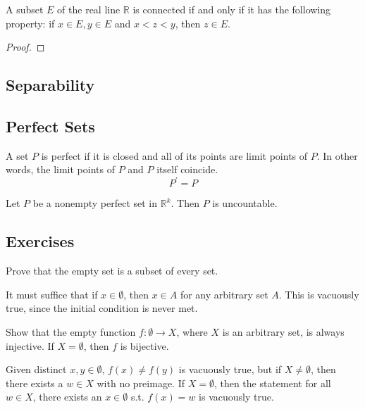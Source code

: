 \documentclass{article}
\begin{document}
    \begin{theorem}
    A subset $E$ of the real line $\mathbb{R}$ is connected if and only if it has the following property: if $x \in E, y \in E$ and $x < z < y$, then $z \in E$. 
    \end{theorem}
    \begin{proof}

    \end{proof}

  \subsection{Separability}

  \subsection{Perfect Sets}

    \begin{definition}
      A set $P$ is perfect if it is closed and all of its points are limit points of $P$. In other words, the limit points of $P$ and $P$ itself coincide. 
      \begin{equation}
        P^\prime = P
      \end{equation}
    \end{definition}

    \begin{theorem}
      Let $P$ be a nonempty perfect set in $\mathbb{R}^k$. Then $P$ is uncountable. 
    \end{theorem}

  \subsection{Exercises}

    \begin{exercise}[Rudin 2.1]
    Prove that the empty set is a subset of every set. 
    \end{exercise}
    \begin{solution}
    It must suffice that if $x \in \emptyset$, then $x \in A$ for any arbitrary set $A$. This is vacuously true, since the initial condition is never met. 
    \end{solution}

    \begin{exercise}
    Show that the empty function $f: \emptyset \rightarrow X$, where $X$ is an arbitrary set, is always injective. If $X = \emptyset$, then $f$ is bijective. 
    \end{exercise}
    \begin{solution}
    Given distinct $x, y \in \emptyset$, $f(x) \neq f(y)$ is vacuously true, but if $X \neq \emptyset$, then there exists a $w \in X$ with no preimage. If $X = \emptyset$, then the statement for all $w \in X$, there exists an $x \in \emptyset$ s.t. $f(x) = w$ is vacuously true. 
    \end{solution}
\end{document}
